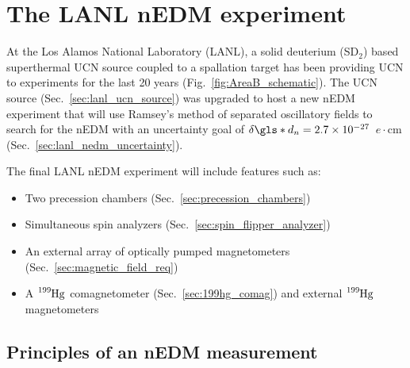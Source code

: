 
\chapter{The LANL nEDM experiment}\label{chap:LANL_nEDM}


At the Los Alamos National Laboratory (LANL), a solid deuterium (SD$_2$) based superthermal UCN source coupled to a spallation target has been providing UCN to experiments for the last 20 years (Fig.~\ref{fig:AreaB_schematic}). The UCN source (Sec.~\ref{sec:lanl_ucn_source}) was upgraded to host a new nEDM experiment that will use Ramsey's method of separated oscillatory fields to search for the nEDM with an uncertainty goal of $\delta \gls*{d_n} = 2.7\times 10^{-27}$~$e\cdot\text{cm}$ (Sec.~\ref{sec:lanl_nedm_uncertainty}).

The final LANL nEDM experiment will include features such as:
%
\begin{itemize}
    \item Two precession chambers (Sec.~\ref{sec:precession_chambers})
    \item Simultaneous spin analyzers (Sec.~\ref{sec:spin_flipper_analyzer})
    \item An external array of optically pumped magnetometers (Sec.~\ref{sec:magnetic_field_req})
    \item A $\ce{^{199}Hg}$ comagnetometer (Sec.~\ref{sec:199hg_comag}) and external $\ce{^{199}Hg}$ magnetometers
\end{itemize}


\section{Principles of an nEDM measurement}\label{sec:principles_nEDM}


